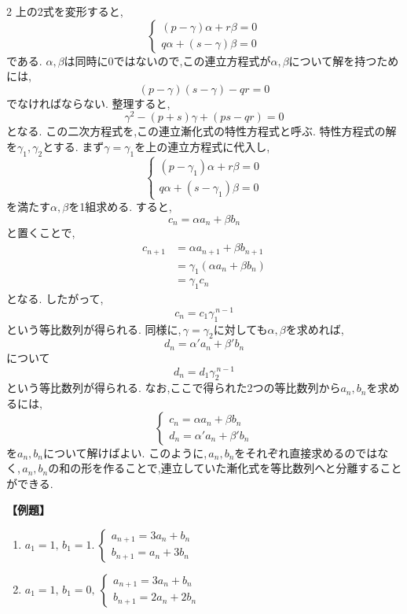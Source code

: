 \documentclass[dvipdfmx,a4paper,11pt,fleqn,openany]{jsbook}
\begin{document}
\begin{multicols*}{2}
      上の2式を変形すると,
      \[
      \begin{cases}
        (p-\gamma)\alpha+r\beta=0\\
        q\alpha+(s-\gamma)\beta=0
      \end{cases}
      \]
      である.
      $\alpha,\beta$は同時に$0$ではないので,この連立方程式が$\alpha,\beta$について解を持つためには,
      \[
        (p-\gamma)(s-\gamma)-qr=0
      \]
      でなければならない.
      整理すると,
      \[
        \gamma^2-(p+s)\gamma+(ps-qr)=0
      \]
      となる.
      この二次方程式を,この連立漸化式の特性方程式と呼ぶ.
      特性方程式の解を$\gamma_1,\gamma_2$とする.
      まず$\gamma=\gamma_1$を上の連立方程式に代入し,
      \[
        \begin{cases}
          (p-\gamma_1)\alpha+r\beta=0\\
          q\alpha+(s-\gamma_1)\beta=0
        \end{cases}
      \]
      を満たす$\alpha,\beta$を1組求める.
      すると,
      \[
        c_n=\alpha a_n+\beta b_n
      \]
      と置くことで,
      \begin{align*}
        c_{n+1}&=\alpha a_{n+1}+\beta b_{n+1}\\
        &=\gamma_1(\alpha a_n+\beta b_n)\\
        &=\gamma_1c_n
      \end{align*}
      となる.
      したがって,
      \[
        c_n=c_1\gamma_1^{\,n-1}
      \]
      という等比数列が得られる.
      同様に,\,$\gamma=\gamma_2$に対しても$\alpha,\beta$を求めれば,
      \[
        d_n=\alpha' a_n+\beta' b_n
      \]
      について
      \[
        d_n=d_1\gamma_2^{\,n-1}
      \]
      という等比数列が得られる.
      なお,ここで得られた2つの等比数列から$a_n,b_n$を求めるには,
      \[
        \begin{cases}
        c_n=\alpha a_n+\beta b_n\\
        d_n=\alpha'a_n+\beta'b_n
        \end{cases}
      \]
      を$a_n,b_n$について解けばよい.
      このように,\,$a_n,b_n$をそれぞれ直接求めるのではなく,\,$a_n,b_n$の和の形を作ることで,連立していた漸化式を等比数列へと分離することができる.

      \noindent \textbf{【例題】}
      \begin{enumerate}[label=(\arabic*),parsep=3pt]
        \item $\displaystyle a_1=1,\,b_1=1.\ \begin{cases}a_{n+1}=3a_n+b_n\\ b_{n+1}=a_n+3b_n\end{cases}$
        \item $\displaystyle a_1=1,\,b_1=0,\ \begin{cases}a_{n+1}=3a_n+b_n\\ b_{n+1}=2a_n+2b_n\end{cases}$
      \end{enumerate}


\end{multicols*}
\end{document}
